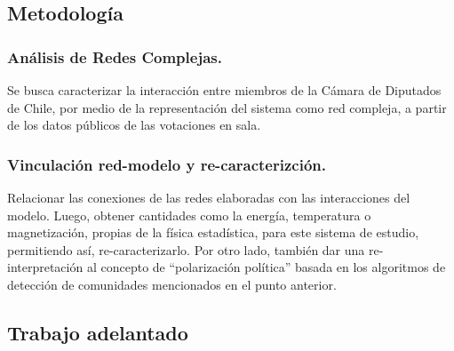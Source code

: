 \documentclass{proyectotesis}
\begin{document}
\subsection{Metodología}
\subsubsection{Análisis de Redes Complejas.} Se busca caracterizar la interacción entre miembros de la Cámara de Diputados de Chile, por medio de la representación del sistema como red compleja, a partir de los datos públicos de las votaciones en sala. 
%
%
%


\subsubsection{Vinculación red-modelo y re-caracterizción.} Relacionar las conexiones de las redes elaboradas con las interacciones del modelo. Luego, obtener cantidades como la energía, temperatura o magnetización, propias de la física estadística, para este sistema de estudio, permitiendo así, re-caracterizarlo. Por otro lado, también dar una re-interpretación al concepto de ``polarización política''  basada en los algoritmos de detección de comunidades mencionados en el punto anterior. 
\subsection{Trabajo adelantado}
\end{document}
